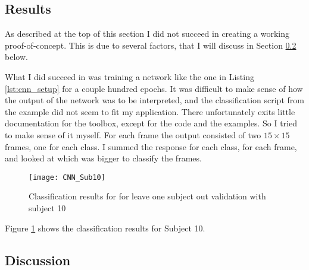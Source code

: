 \documentclass[Main]{subfiles}
\begin{document}
	\subsection{Results} %
		\label{sub:cnn_results}
		As described at the top of this section I did not succeed in creating a working proof-of-concept.
		This is due to several factors, that I will discuss in Section \ref{sub:cnn_discussion} below.

		What I did succeed in was training a network like the one in Listing \ref{lst:cnn_setup} for a couple hundred epochs.
		It was difficult to make sense of how the output of the network was to be interpreted, and the classification script from the example did not seem to fit my application.
		There unfortunately exits little documentation for the toolbox, except for the code and the examples.
		So I tried to make sense of it myself.
		For each frame the output consisted of two $15\times15$ frames, one for each class.
		I summed the response for each class, for each frame, and looked at which was bigger to classify the frames.
		\begin{figure}[H]
			\begin{center}
				\texttt{[image: CNN\_Sub10]}
			\end{center}
			\caption{Classification results for for leave one subject out validation with subject 10}
			\label{fig:Results_sub10}
		\end{figure}
		Figure \ref{fig:Results_sub10} shows the classification results for Subject 10. 





		


	\subsection{Discussion} %
		\label{sub:cnn_discussion}
		


	
\end{document}
